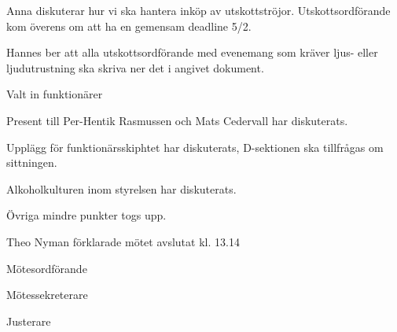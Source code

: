 \documentclass[10pt]{article}
\def\mo{Theo Nyman}
\def\ms{Hannes Björk}
\def\ji{Sophia Carlsson}
\begin{document}
\begin{paragrafer}
Anna diskuterar hur vi ska hantera inköp av utskottströjor.
Utskottsordförande kom överens om att ha en gemensam deadline 5/2.

Hannes ber att alla utskottsordförande med evenemang som kräver ljus- eller ljudutrustning ska skriva ner det i angivet dokument.


Valt in funktionärer

Present till Per-Hentik Rasmussen och Mats Cedervall har diskuterats.

Upplägg för funktionärsskiphtet har diskuterats, D-sektionen ska tillfrågas om sittningen.

Alkoholkulturen inom styrelsen har diskuterats.

Övriga mindre punkter togs upp.

{\mo} förklarade mötet avslutat kl. 13.14
\end{paragrafer}

\hidesignfoot
\begin{signatures}{3}
\signature{\mo}{Mötesordförande}
\signature{\ms}{Mötessekreterare}
\signature{\ji}{Justerare}
\end{signatures}
\end{document}
